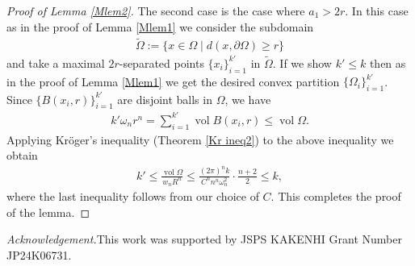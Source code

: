 \documentclass[12pt]{amsart}
\theoremstyle{plain}
\theoremstyle{remark}
\newcommand{\vol}{\operatorname{vol}}
\begin{document}
\begin{proof}[Proof of Lemma \ref{Mlem2}]
The second case is the case where $a_1>2r$. In this case as in the proof of Lemma \ref{Mlem1} we consider the subdomain
\begin{align*}
    \widetilde{\Omega}:=\{x\in \Omega \mid d(x,\partial\Omega)\geq r\}
\end{align*}and take a maximal $2r$-separated points $\{x_i\}_{i=1}^{k'}$ in $\widetilde{\Omega}$. If we show $k'\leq k$ then as in the proof of Lemma \ref{Mlem1} we get the desired convex partition $\{\Omega_i\}_{i=1}^{k'}$. Since $\{B(x_i,r)\}_{i=1}^{k'}$ are disjoint balls in $\Omega$, we have
\begin{align*}
k'\omega_n r^n=\sum_{i=1}^{k'}\vol B(x_i,r)\leq \vol \Omega.   
\end{align*}Applying Kr\"{o}ger's inequality (Theorem \ref{Kr ineq2}) to the above inequality we obtain
\begin{align*}
    k'\leq \frac{\vol \Omega}{w_n R^n}\leq\frac{(2\pi)^n k}{C^n n^n \omega_n^2 }\cdot \frac{n+2}{2}\leq k,
\end{align*}where the last inequality follows from our choice of $C$. This completes the proof of the lemma. 
\end{proof}

\emph{Acknowledgement.}This work was supported by JSPS KAKENHI Grant Number JP24K06731.
\end{document}
